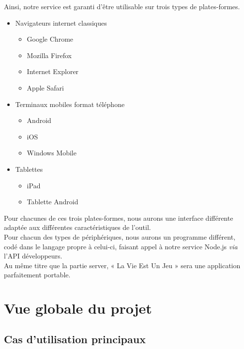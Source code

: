 \documentclass{life-fr}
\begin{document}
Ainsi, notre service est garanti d'être utilisable sur trois types de plates-formes.

\begin{itemize}
  \item Navigateurs internet classiques
    \begin{itemize}
      \item Google Chrome
      \item Mozilla Firefox
      \item Internet Explorer
      \item Apple Safari
    \end{itemize}
  \item Terminaux mobiles format téléphone
    \begin{itemize}
      \item Android
      \item iOS
      \item Windows Mobile
    \end{itemize}
  \item Tablettes
    \begin{itemize}
      \item iPad
      \item Tablette Android
    \end{itemize}
\end{itemize}

Pour chacunes de ces trois plates-formes, nous aurons une interface différente 
adaptée aux différentes caractéristiques de l'outil.\\
Pour chacun des types de périphériques, nous aurons un programme différent,
codé dans le langage propre à celui-ci, faisant appel à notre service Node.js
\textit{via} l'API développeurs.\\

Au même titre que la partie server, « La Vie Est Un Jeu » sera une application parfaitement portable.

\chapter{Vue globale du projet}
\section{Cas d'utilisation principaux}
\end{document}
